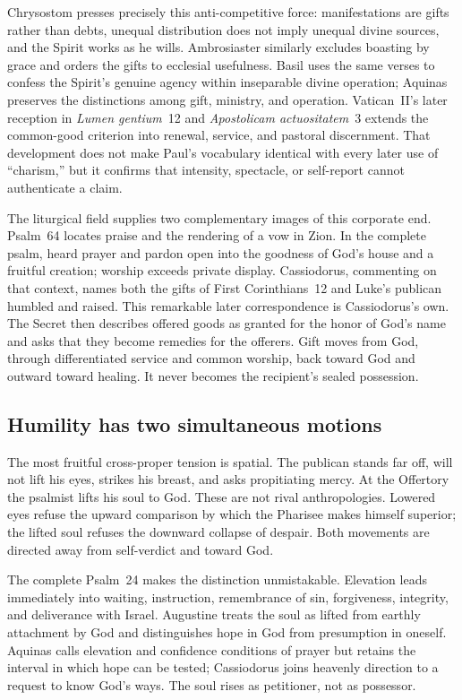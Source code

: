 Chrysostom presses precisely this anti-competitive force: manifestations are
gifts rather than debts, unequal distribution does not imply unequal divine
sources, and the Spirit works as he wills.  Ambrosiaster similarly excludes
boasting by grace and orders the gifts to ecclesial usefulness.  Basil uses
the same verses to confess the Spirit's genuine agency within inseparable
divine operation; Aquinas preserves the distinctions among gift, ministry,
and operation.  Vatican~II's later reception in \emph{Lumen gentium}~12 and
\emph{Apostolicam actuositatem}~3 extends the common-good criterion into
renewal, service, and pastoral discernment.  That development does not make
Paul's vocabulary identical with every later use of ``charism,'' but it
confirms that intensity, spectacle, or self-report cannot authenticate a
claim.

The liturgical field supplies two complementary images of this corporate end.
Psalm~64 locates praise and the rendering of a vow in Zion.  In the complete
psalm, heard prayer and pardon open into the goodness of God's house and a
fruitful creation; worship exceeds private display.  Cassiodorus, commenting
on that context, names both the gifts of First Corinthians~12 and Luke's
publican humbled and raised.  This remarkable later correspondence is
Cassiodorus's own.
The Secret then describes offered goods as granted for the honor of God's
name and asks that they become remedies for the offerers.  Gift moves from
God, through differentiated service and common worship, back toward God and
outward toward healing.  It never becomes the recipient's sealed possession.

\subsection*{Humility has two simultaneous motions}

The most fruitful cross-proper tension is spatial.  The publican stands far
off, will not lift his eyes, strikes his breast, and asks propitiating mercy.
At the Offertory the psalmist lifts his soul to God.  These are not rival
anthropologies.  Lowered eyes refuse the upward comparison by which the
Pharisee makes himself superior; the lifted soul refuses the downward collapse
of despair.  Both movements are directed away from self-verdict and toward
God.

The complete Psalm~24 makes the distinction unmistakable.  Elevation leads
immediately into waiting, instruction, remembrance of sin, forgiveness,
integrity, and deliverance with Israel.  Augustine treats the soul as lifted
from earthly attachment by God and distinguishes hope in God from presumption
in oneself.  Aquinas calls elevation and confidence conditions of prayer but
retains the interval in which hope can be tested; Cassiodorus joins heavenly
direction to a request to know God's ways.  The soul rises as petitioner, not
as possessor.

